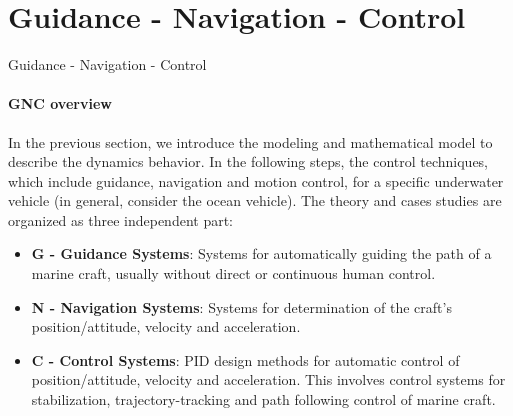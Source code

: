 \section{Guidance - Navigation - Control}

\begin{frame}{Guidance - Navigation - Control}
	\framesubtitle{GNC overview}
	In the previous section, we introduce the modeling and mathematical model to describe the dynamics behavior. In the following steps, the control techniques, which include guidance, navigation and motion control, for a specific underwater vehicle (in general, consider the ocean vehicle).  The theory and cases studies are organized as three independent part:
	\begin{itemize}
		\item \textbf{G -  Guidance Systems}: Systems for automatically guiding the path of a marine craft, usually without direct or continuous human control.
		\item \textbf{N -  Navigation Systems}: Systems for determination of the craft’s position/attitude, velocity and acceleration.
		\item \textbf{C - Control Systems}: PID design methods for automatic control of position/attitude,
		velocity and acceleration. This involves control systems for stabilization, trajectory-tracking and path following control of marine craft.
	\end{itemize}
\end{frame}








